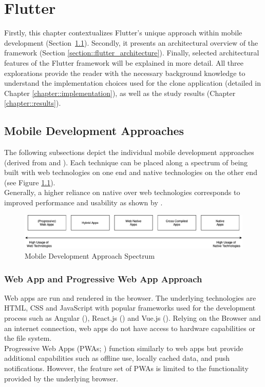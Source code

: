 \chapter{Flutter} \label{chapter::flutter}
Firstly, this chapter contextualizes Flutter's unique approach within mobile development (Section~\ref{section::other_architectures}). 
Secondly, it presents an architectural overview of the framework (Section \ref{section::flutter_architecture}). 
Finally, selected architectural features of the Flutter framework will be explained in more detail.
All three explorations provide the reader with the necessary background knowledge to understand the implementation choices used for the clone application (detailed in Chapter \ref{chapter::implementation}),
as well as the study results (Chapter \ref{chapter::results}).

\section{Mobile Development Approaches} \label{section::other_architectures}
The following subsections depict the individual mobile development approaches (derived from \cite{Heitkoetter2013} and \cite{Cunha2018}).
Each technique can be placed along a spectrum of being built with web technologies on one end and native technologies on the other end (see Figure \ref{fig::mobile_development_approach_spectrum}).\\
Generally, a higher reliance on native over web technologies corresponds to improved performance and usability as shown by \textcite{Heitkoetter2013}.

\begin{figure}
    \centering
    \includegraphics[width=\linewidth]{images/architectures/mobile_development_approaches.eps}
    \caption{Mobile Development Approach Spectrum}
    \label{fig::mobile_development_approach_spectrum}
\end{figure}


\subsection{Web App and Progressive Web App Approach} \label{subsection::web_apps}
Web apps are run and rendered in the browser. The underlying technologies are HTML, CSS and JavaScript with popular frameworks 
used for the development process such as Angular (\cite{Angular2021}), React.js (\cite{React2021}) and Vue.js (\cite{Vue2021}). 
Relying on the Browser and an internet connection, web apps do not have access to hardware capabilities or the file system.\\
Progressive Web Apps (PWAs; \cite{MozillaFoundation2021}) function similarly to web apps but provide additional capabilities such as offline use, locally cached data, 
and push notifications. However, the feature set of PWAs is limited to the functionality provided by the underlying browser.

